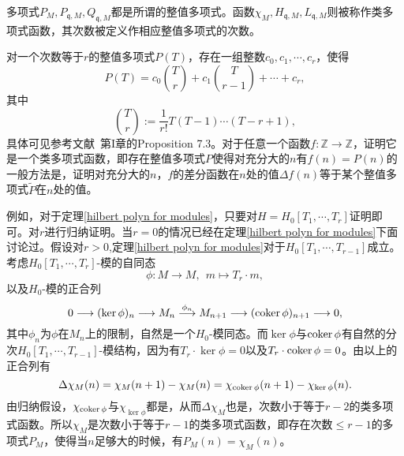 \begin{remark}
多项式$P_M, P_{\mathfrak{q},M}, Q_{\mathfrak{q},M}$都是所谓的整值多项式。函数$\chi_M, H_{\mathfrak{q},M}, L_{\mathfrak{q},M}$则被称作类多项式函数，其次数被定义作相应整值多项式的次数。

对一个次数等于$r$的整值多项式$P(T)$，存在一组整数$c_0, c_1, \cdots, c_r$，使得
\begin{equation}
P(T) = c_0\binom{T}{r} + c_1\binom{T}{r-1} + \cdots + c_r,
\end{equation}
其中
\begin{equation}
\binom{T}{r}:=\dfrac{1}{r!}T(T-1)\cdots(T-r+1),
\end{equation}
具体可见参考文献~第I章的Proposition 7.3。对于任意一个函数$f:\mathbb{Z}\to\mathbb{Z}$，证明它是一个类多项式函数，即存在整值多项式$P$使得对充分大的$n$有$f(n) = P(n)$的一般方法是，证明对充分大的$n$，$f$的差分函数在$n$处的值$\Delta f(n)$等于某个整值多项式$\widetilde{P}$在$n$处的值。

例如，对于定理\ref{hilbert polyn for modules}，只要对$H = H_0[T_1,\cdots,T_r]$证明即可。对$r$进行归纳证明。当$r=0$的情况已经在定理\ref{hilbert polyn for modules}下面讨论过。假设对$r>0$,定理\ref{hilbert polyn for modules}对于$H_0[T_1,\cdots,T_{r-1}]$成立。考虑$H_0[T_1,\cdots,T_r]$-模的自同态
\begin{equation}
\phi: M \longrightarrow M, ~~ m \mapsto T_r\cdot m,
\end{equation}
以及$H_0$-模的正合列
\begin{equation}
0 \longrightarrow (\ker\phi)_n \longrightarrow M_n \overset{\phi_n}{\longrightarrow} M_{n+1} \longrightarrow (\operatorname{coker}\phi)_{n+1} \longrightarrow 0,
\end{equation}
其中$\phi_n$为$\phi$在$M_n$上的限制，自然是一个$H_0$-模同态。而$\ker\phi$与$\operatorname{coker}\phi$有自然的分次$H_0[T_1,\cdots,T_{r-1}]$-模结构，因为有$T_r\cdot \ker\phi = 0$以及$T_r\cdot \operatorname{coker}\phi = 0$。由以上的正合列有
\begin{equation}
\Delta\chi_M(n) = \chi_M(n+1) - \chi_M(n) = \chi_{\operatorname{coker}\phi}(n+1) - \chi_{\ker\phi}(n).
\end{equation}
由归纳假设，$\chi_{\operatorname{coker}\phi}$与$\chi_{\ker\phi}$都是，从而$\Delta\chi_M$也是，次数小于等于$r-2$的类多项式函数。所以$\chi_M$是次数小于等于$r-1$的类多项式函数，即存在次数$\leqslant r-1$的多项式$P_M$，使得当$n$足够大的时候，有$P_M(n) = \chi_M(n)$。
\end{remark}

